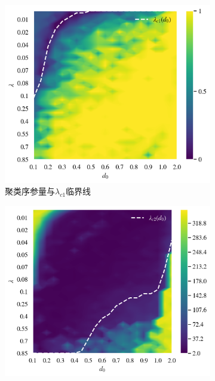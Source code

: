 \documentclass{article}
\begin{document}
\begin{figure}[H]
	\centering
	\begin{subfigure}[b]{0.49\textwidth}
		\includegraphics[width=\textwidth]{./figs/circleSwarmEdgesSync.png}
		\vspace{-1cm}
		\caption{聚类序参量与$\lambda_{c1}$临界线}
	\end{subfigure}
	\begin{subfigure}[b]{0.49\textwidth}
		\includegraphics[width=\textwidth]{./figs/circleSwarmEdgesCounts.png}

\end{subfigure}
\end{figure}
\end{document}
